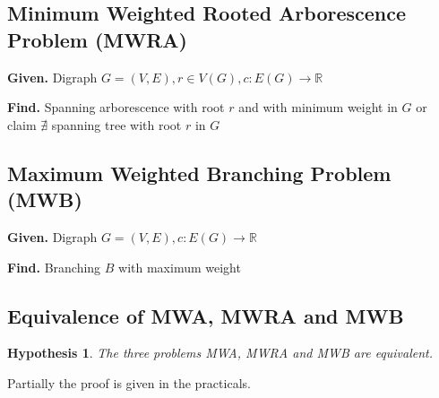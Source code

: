 \documentclass{article}
\newtheorem*{hypothesis}{Hypothesis}
\newcommand{\given}[1]{\textbf{Given.} #1\par}
\newcommand{\find}[1]{\textbf{Find.} #1\par}
\begin{document}
\subsection{Minimum Weighted Rooted Arborescence Problem (MWRA)}
%
\given{Digraph $G = (V, E), r \in V(G), c: E(G) \rightarrow \mathbb{R}$}
\find{Spanning arborescence with root $r$ and with minimum weight in $G$ or claim $\nexists$ spanning tree with root $r$ in $G$}
%
\subsection{Maximum Weighted Branching Problem (MWB)}
%
\given{Digraph $G = (V, E), c: E(G) \rightarrow \mathbb{R}$}
\find{Branching $B$ with maximum weight}
%
\subsection{Equivalence of MWA, MWRA and MWB}
%
\begin{hypothesis}
  The three problems MWA, MWRA and MWB are equivalent.
\end{hypothesis}

Partially the proof is given in the practicals.
\end{document}
